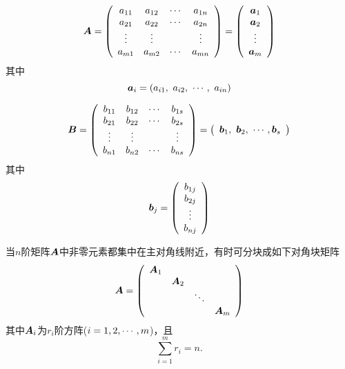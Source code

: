 \begin{frame}
  \begin{dingyi}[矩阵的按行分块]
    $$
    \boldsymbol{A} = \left(
      \begin{array}{cccc}
        a_{11} & a_{12} & \cdots & a_{1n}\\
        a_{21} & a_{22} & \cdots & a_{2n}\\
        \vdots & \vdots & & \vdots \\
        a_{m1} & a_{m2} & \cdots & a_{mn}
      \end{array}
    \right)
    = \left(
      \begin{array}{c}
        {\boldsymbol{a}}_1\\
        {\boldsymbol{a}}_2\\
        \vdots \\
        {\boldsymbol{a}}_m
      \end{array}
    \right)
    $$
    其中
    $$
    {\boldsymbol{a}}_i = (a_{i1}, ~a_{i2}, ~\cdots, ~a_{in})
    $$
  \end{dingyi}
\end{frame}

\begin{frame}
  \begin{dingyi}[矩阵的按列分块]
    $$
    \boldsymbol{B} = \left(
      \begin{array}{cccc}
        b_{11} & b_{12} & \cdots & b_{1s}\\
        b_{21} & b_{22} & \cdots & b_{2s}\\
        \vdots & \vdots & & \vdots \\
        b_{n1} & b_{n2} & \cdots & b_{ns}
      \end{array}
    \right)
    = \left(
      \begin{array}{c}
        {\boldsymbol{b}}_1, ~ {\boldsymbol{b}}_2, ~ \cdots, {\boldsymbol{b}}_s
      \end{array}
    \right)
    $$
    其中
    $$
    {\boldsymbol{b}}_j = \left(
      \begin{array}{c}
        b_{1j}\\
        b_{2j}\\
        \vdots\\
        b_{nj}
      \end{array}
    \right)
    $$
  \end{dingyi}
\end{frame}

\begin{frame}
  当$n$阶矩阵$\boldsymbol{A}$中非零元素都集中在主对角线附近，有时可分块成如下\textcolor{acolor3}{对角块矩阵}
  $$
  \boldsymbol{A} = \left(
    \begin{array}{cccc}
      \boldsymbol{A}_1 & & &\\
           &\boldsymbol{A}_2&&\\
           &&\ddots&\\
           &&&\boldsymbol{A}_m
    \end{array}
  \right)
  $$
  其中$\boldsymbol{A}_i$为$r_i$阶方阵($i=1,2,\cdots,m$)，且
  $$
  \sum_{i=1}^m r_i = n.
  $$

\end{frame}

